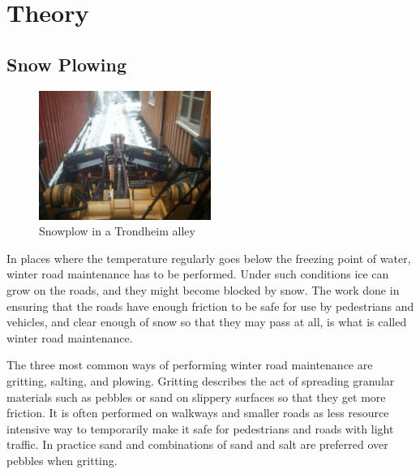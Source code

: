 \chapter{Theory}
\label{theory}

\section{Snow Plowing} %
\label{sec:snow_plowing}


\begin{figure}
	\begin{center}
		\includegraphics[width=0.5\textwidth]{figures/MachineryIllustrations/snowplow-Kent_Syrstadlokk-2012-04-18.jpg}
	\end{center}
	\caption{Snowplow in a Trondheim alley}
	\label{fig:snowplow_in_alley}
\end{figure}

In places where the temperature regularly goes below the freezing point of water, winter road maintenance has to be performed. Under such conditions ice can grow on the roads, and they might become blocked by snow. The work done in ensuring that the roads have enough friction to be safe for use by pedestrians and vehicles, and clear enough of snow so that they may pass at all, is what is called winter road maintenance.

The three most common ways of performing winter road maintenance are gritting, salting, and plowing. Gritting describes the act of spreading granular materials such as pebbles or sand on slippery surfaces so that they get more friction. It is often performed on walkways and smaller roads as less resource intensive way to temporarily make it safe for pedestrians and roads with light traffic. In practice sand and combinations of sand and salt are preferred over pebbles when gritting.

